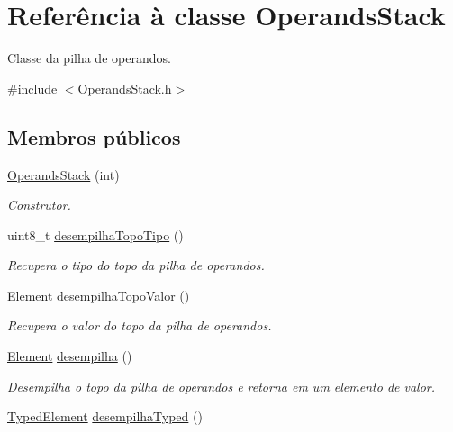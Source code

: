 \hypertarget{classOperandsStack}{}\section{Referência à classe Operands\+Stack}
\label{classOperandsStack}


Classe da pilha de operandos.  




{\ttfamily \#include $<$Operands\+Stack.\+h$>$}

\subsection*{Membros públicos}
\begin{DoxyCompactItemize}
\item 
\hyperlink{classOperandsStack_a5ea2e7d609262388d0d4bc3ba08a2c32}{Operands\+Stack} (int)
\begin{DoxyCompactList}\small\item\em Construtor. \end{DoxyCompactList}\item 
uint8\+\_\+t \hyperlink{classOperandsStack_a8c76f12ad6984b3c5b4ec8807eb63ae3}{desempilha\+Topo\+Tipo} ()
\begin{DoxyCompactList}\small\item\em Recupera o tipo do topo da pilha de operandos. \end{DoxyCompactList}\item 
\hyperlink{BasicTypes_8h_a8132f4f0515064141e31e606660df561}{Element} \hyperlink{classOperandsStack_a184a99d160e17ef874a7b83f0726fb8a}{desempilha\+Topo\+Valor} ()
\begin{DoxyCompactList}\small\item\em Recupera o valor do topo da pilha de operandos. \end{DoxyCompactList}\item 
\hyperlink{BasicTypes_8h_a8132f4f0515064141e31e606660df561}{Element} \hyperlink{classOperandsStack_a3213a1b633149de9332217d403ee84b6}{desempilha} ()
\begin{DoxyCompactList}\small\item\em Desempilha o topo da pilha de operandos e retorna em um elemento de valor. \end{DoxyCompactList}\item 
\hyperlink{BasicTypes_8h_a97b332303b1262282599e6ede0637b82}{Typed\+Element} \hyperlink{classOperandsStack_a9503313a7def4c11fb782d5881e3d6cb}{desempilha\+Typed} ()

\end{DoxyCompactItemize}
